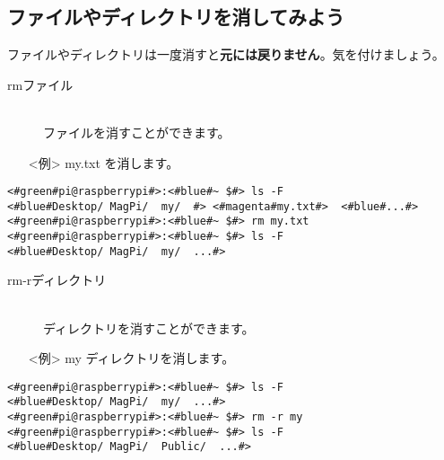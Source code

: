 \subsection{ファイルやディレクトリを消してみよう}
ファイルやディレクトリは一度消すと\textbf{元には戻りません}。気を付けましょう。
\begin{description}
\item[rm\textvisiblespace ファイル]\mbox{}\\
ファイルを消すことができます。
\end{description}
\begin{itemize}
\item[<例>]my.txt を消します。
\end{itemize}
\begin{lstlisting}[caption=cpの例, label=cp]
<#green#pi@raspberrypi#>:<#blue#~ $#> ls -F
<#blue#Desktop/	MagPi/	my/	 #>	<#magenta#my.txt#>	<#blue#...#>
<#green#pi@raspberrypi#>:<#blue#~ $#> rm my.txt
<#green#pi@raspberrypi#>:<#blue#~ $#> ls -F
<#blue#Desktop/	MagPi/	my/	 ...#>
\end{lstlisting}
\begin{description}
\item[rm\textvisiblespace -r\textvisiblespace ディレクトリ]\mbox{}\\
ディレクトリを消すことができます。
\end{description}
\begin{itemize}
\item[<例>]my ディレクトリを消します。
\end{itemize}
\begin{lstlisting}[caption=cp -rの例, label=cp-R]
<#green#pi@raspberrypi#>:<#blue#~ $#> ls -F
<#blue#Desktop/	MagPi/	my/	 ...#>
<#green#pi@raspberrypi#>:<#blue#~ $#> rm -r my
<#green#pi@raspberrypi#>:<#blue#~ $#> ls -F
<#blue#Desktop/	MagPi/	Public/	 ...#>
\end{lstlisting}
\begin{tcolorbox}[title=\useOmetoi]
\begin{enumerate}
\end{enumerate}
\end{tcolorbox}
